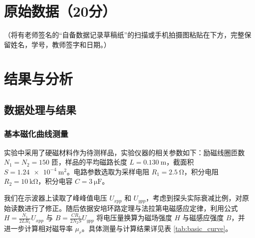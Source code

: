 \documentclass{../../templates/Report}%
\begin{document}
\begin{fullreportonly}
    \section{原始数据（20分）}
    （将有老师签名的“自备数据记录草稿纸”的扫描或手机拍摄图粘贴在下方，完整保留姓名，学号，教师签字和日期。）

    \section{结果与分析}

    \subsection{数据处理与结果}

    \subsubsection{基本磁化曲线测量}

    实验中采用了硬磁材料作为待测样品，实验仪器的相关参数如下：励磁线圈匝数 $N_1=N_2=150$ 匝，样品的平均磁路长度 $L=\SI{0.130}{\meter}$，截面积 $S=\SI{1.24e-4}{\meter\squared}$。电路参数选取为采样电阻 $R_1=\SI{2.5}{\ohm}$，积分电阻 $R_2=\SI{10}{\kilo\ohm}$，积分电容 $C=\SI{3}{\micro\farad}$。

    我们在示波器上读取了峰峰值电压 $U_{xpp}$ 和 $U_{ypp}$，考虑到探头实际衰减比例，对原始读数进行了修正。随后依据安培环路定理与法拉第电磁感应定律，利用公式 $H = \frac{N_1}{2 L R_1} U_{xpp}$ 与 $B = \frac{C R_2}{2 N_2 S} U_{ypp}$ 将电压量换算为磁场强度 $H$ 与磁感应强度 $B$，并进一步计算相对磁导率 $\mu_r$。具体测量与计算结果详见表 \ref{tab:basic_curve}。


\end{fullreportonly}
\end{document}
